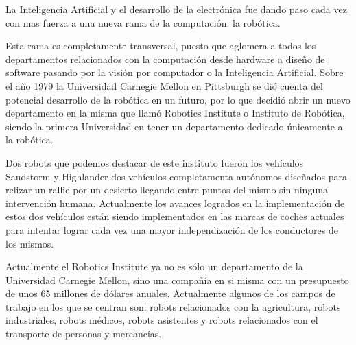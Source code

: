 La Inteligencia Artificial y el desarrollo de la electrónica fue dando paso cada vez con mas fuerza a una nueva rama de la computación: la robótica.

\vspace{10px}

Esta rama es completamente transversal, puesto que aglomera a todos los departamentos relacionados con la computación desde hardware a diseño de software pasando por la visión por computador o la Inteligencia Artificial. Sobre el año 1979 la Universidad Carnegie Mellon en Pittsburgh se dió cuenta del potencial desarrollo de la robótica en un futuro, por lo que decidió abrir un nuevo departamento en la misma que llamó Robotics Institute o Instituto de Robótica, siendo la primera Universidad en tener un departamento dedicado únicamente a la robótica.

\vspace{10px}

Dos robots que podemos destacar de este instituto fueron los vehículos Sandstorm y Highlander dos vehículos completamenta autónomos diseñados para relizar un rallie por un desierto llegando entre puntos del mismo sin ninguna intervención humana. Actualmente los avances logrados en la implementación de estos dos vehículos están siendo implementados en las marcas de coches actuales para intentar lograr cada vez una mayor independización de los conductores de los mismos.

\vspace{10px}

Actualmente el Robotics Institute ya no es sólo un departamento de la Universidad Carnegie Mellon, sino una compañía en si misma con un presupuesto de unos 65 millones de dólares anuales. Actualmente algunos de los campos de trabajo en los que se centran son: robots relacionados con la agricultura, robots industriales, robots médicos, robots asistentes y robots relacionados con el transporte de personas y mercancías.
